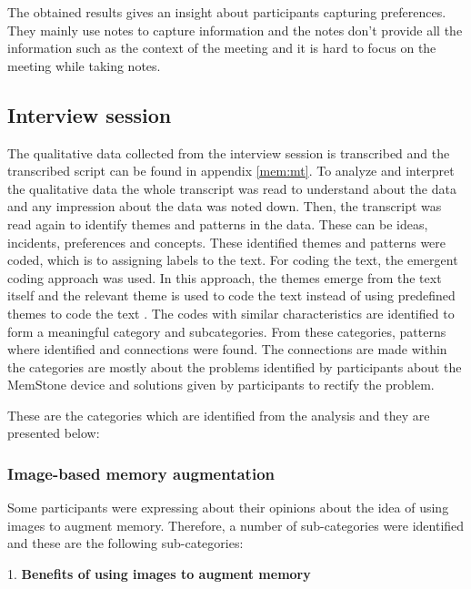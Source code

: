 \documentclass[mscthesis]{usiinfthesis}
\begin{document}
The obtained results gives an insight about participants capturing preferences. They mainly use notes to capture information and the notes don't provide all the information such as the context of the meeting and it is hard to focus on the meeting while taking notes.

\subsection*{Interview session}
The qualitative data collected from the interview session is transcribed and the transcribed script can be found in appendix \ref{mem:mt}. To analyze and interpret the qualitative data the whole transcript was read to understand about the data and any impression about the data was noted down. Then, the transcript was read again to identify themes and patterns in the data. These can be ideas, incidents, preferences and concepts. These identified themes and patterns were coded, which is to assigning labels to the text. For coding the text, the emergent coding approach was used. In this approach, the themes emerge from the text itself and the relevant theme is used to code the text instead of using predefined themes to code the text \citep{lazar2017research}. The codes with similar characteristics are identified to form a meaningful category and subcategories. From these categories, patterns where identified and connections were found. The connections are made within the categories are mostly about the problems identified by participants about the MemStone device and solutions given by participants to rectify the problem.

These are the categories which are identified from the analysis and they are presented below:
\newline

\subsubsection*{Image-based memory augmentation}
Some participants were expressing about their opinions about the idea of using images to augment memory. Therefore, a number of sub-categories were identified and these are the following sub-categories: 
\newline

1. \textbf{Benefits of using images to augment memory}
\end{document}
